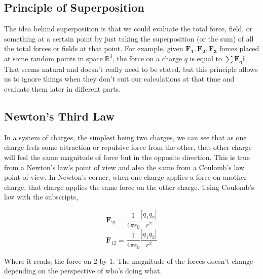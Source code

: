 \subsection{Principle of Superposition}
The idea behind superposition is that we could evaluate the total force, field, or something at a certain point by just taking the superposition (or the sum) of all the total forces or fields at that point. For example, given $\mathbf{F_1,F_2,F_3}$ forces placed at some random points in space $\mathbb{R}^3$, the force on a charge $q$ is equal to $\sum \mathbf{F_qi}$. That seems natural and doesn't really need to be stated, but this principle allows us to ignore things when they don't suit our calculations at that time and evaluate them later in different parts. 

\subsection{Newton's Third Law}
In a system of charges, the simplest being two charges, we can see that as one charge feels some attraction or repulsive force from the other, that other charge will feel the same magnitude of force but in the opposite direction. This is true from a Newton's law's point of view and also the same from a Coulomb's law point of view. In Newton's corner, when one charge applies a force on another charge, that charge applies the same force on the other charge. Using Coulomb's law with the subscripts, 


	\begin{equation*}
		\mathbf{F}_{21} = \frac{1}{4\pi\epsilon_0} \frac{|q_1q_2|}{r^2} 
	\end{equation*}
	\begin{equation*}
		\mathbf{F}_{12} = \frac{1}{4\pi\epsilon_0} \frac{|q_1q_2|}{r^2} 
	\end{equation*}

Where it reads, the force on $2$ by $1$. The magnitude of the forces doesn't change depending on the perspective of who's doing what. 
